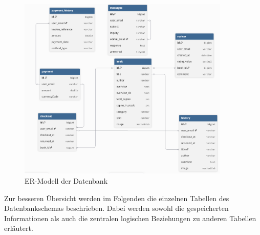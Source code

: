 \begin{figure}[H]
	\centering
	\includegraphics[width=0.9\textwidth]{images/DB-Schema.png}
	\caption{ER-Modell der Datenbank}
	\label{fig:er-model}
\end{figure}

\noindent Zur besseren Übersicht werden im Folgenden die einzelnen Tabellen des Datenbankschemas beschrieben. Dabei werden sowohl die gespeicherten Informationen als auch die zentralen logischen Beziehungen zu anderen Tabellen erläutert.

